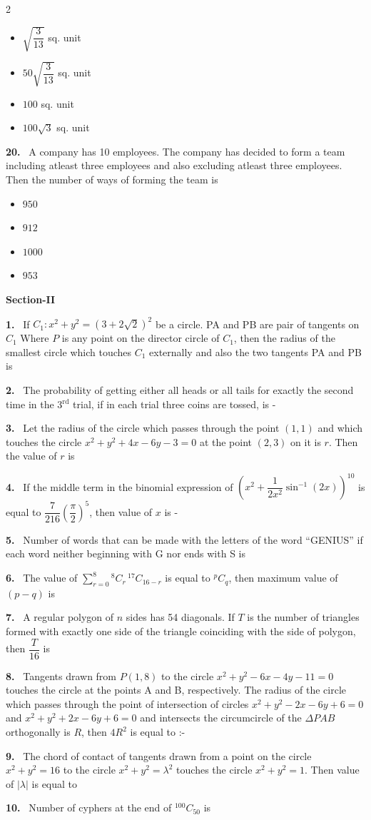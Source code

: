 \documentclass[10pt]{extarticle}
\newcommand{\sect}[1]{\par\smallskip\noindent\textbf{#1}\par}
\newcommand{\qn}[1]{\par\smallskip\noindent\textbf{#1.}~}
\newenvironment{qoptions}{\begin{itemize}[leftmargin=1.8em,itemsep=1pt,topsep=2pt,label={}]}{\end{itemize}}
\newcommand{\opt}[2]{\item[(#1)] #2}
\begin{document}
\begin{multicols}{2}
\begin{qoptions}
\opt{A}{$\sqrt{\dfrac{3}{13}}$ sq. unit}
\opt{B}{$50\sqrt{\dfrac{3}{13}}$ sq. unit}
\opt{C}{$100$ sq. unit}
\opt{D}{$100\sqrt3$ sq. unit}
\end{qoptions}
\qn{20} A company has 10 employees. The company has decided to form a team including atleast three employees and also excluding atleast three employees. Then the number of ways of forming the team is
\begin{qoptions}
\opt{A}{$950$}
\opt{B}{$912$}
\opt{C}{$1000$}
\opt{D}{$953$}
\end{qoptions}
\sect{Section-II}
\qn{1} If $C_1:x^2+y^2=\left(3+2\sqrt2\right)^2$ be a circle. PA and PB are pair of tangents on $C_1$ Where $P$ is any point on the director circle of $C_1$, then the radius of the smallest circle which touches $C_1$ externally and also the two tangents PA and PB is
\qn{2} The probability of getting either all heads or all tails for exactly the second time in the 3$^{\text{rd}}$ trial, if in each trial three coins are tossed, is -
\qn{3} Let the radius of the circle which passes through the point $(1,1)$ and which touches the circle $x^2+y^2+4x-6y-3=0$ at the point $(2,3)$ on it is $r$. Then the value of $r$ is
\qn{4} If the middle term in the binomial expression of $\left(x^2+\dfrac{1}{2x^2}\sin^{-1}(2x)\right)^{10}$ is equal to $\dfrac{7}{216}\left(\dfrac\pi2\right)^5$, then value of $x$ is -
\qn{5} Number of words that can be made with the letters of the word ``GENIUS'' if each word neither beginning with G nor ends with S is
\qn{6} The value of $\displaystyle\sum_{r=0}^{8}{}^8C_r\,{}^{17}C_{16-r}$ is equal to $^pC_q$, then maximum value of $(p-q)$ is
\qn{7} A regular polygon of $n$ sides has 54 diagonals. If $T$ is the number of triangles formed with exactly one side of the triangle coinciding with the side of polygon, then $\dfrac{T}{16}$ is
\qn{8} Tangents drawn from $P(1,8)$ to the circle $x^2+y^2-6x-4y-11=0$ touches the circle at the points A and B, respectively. The radius of the circle which passes through the point of intersection of circles $x^2+y^2-2x-6y+6=0$ and $x^2+y^2+2x-6y+6=0$ and intersects the circumcircle of the $\Delta PAB$ orthogonally is $R$, then $4R^2$ is equal to :-
\qn{9} The chord of contact of tangents drawn from a point on the circle $x^2+y^2=16$ to the circle $x^2+y^2=\lambda^2$ touches the circle $x^2+y^2=1$. Then value of $|\lambda|$ is equal to
\qn{10} Number of cyphers at the end of $^{100}C_{50}$ is
\end{multicols}
\end{document}
